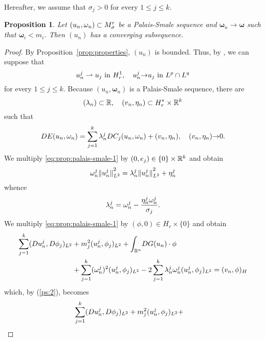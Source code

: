 \documentclass[a4paper,12pt,oneside]{amsart}
\newtheorem{prop}{Proposition}
\theoremstyle{definition}
\theoremstyle{remark}
\theoremstyle{theorem}
\begin{document}
\noindent 
Hereafter, we assume that $ {\sigma}_j > 0 $ for every $ 1\leq j\leq k $.
\begin{prop}
\label{prop:palais-smale}
Let $ (u_n,{\mathbf{\omega}}_n)\subset M_{\sigma}\sp r  $ be a Palais-Smale 
sequence and $ {\mathbf{\omega}}_n {\rightarrow}{\mathbf{\omega}} $ such that $ {\mathbf{\omega}}_i < m_i $.
Then $ (u_n) $ has a converging subsequence.
\end{prop}
\begin{proof}
By Proposition~\ref{prop:properties}, $ (u_n) $
is bounded. Thus, by \cite[Theorem~A.I']{BL83-I}, we can suppose that 
\begin{equation}
\label{eq:prop:palais-smale-9}
u_n \sp j\rightharpoonup u_j\text{ in } H\sp 1 _r,\quad
u_n \sp j{\rightarrow} u_j\text{ in } L\sp p \cap L\sp q 
\end{equation}
for every $ 1\leq j\leq k $.
Because $ (u_n,{\mathbf{\omega}}_n) $ is a Palais-Smale sequence, there are 
\[
(\lambda_n)\subset{\mathbb{R}},\quad
(v_n,\eta_n)\subset H_r \sp *\times{\mathbb{R}}\sp k
\]
such that
\begin{equation}
\label{eq:prop:palais-smale-1}
{D} E (u_n,\omega_n) = \sum_{j = 1}\sp k \lambda_n \sp{j}
{D} C_j (u_n,\omega_n) + (v_n,\eta_n),\quad (v_n,\eta_n){\rightarrow} 0.
\end{equation}
We multiply \eqref{eq:prop:palais-smale-1} by $ (0,e_j)\in \{0\}\times{\mathbb{R}}\sp k $
and obtain
\[
\omega_n\sp{j}{\|{u_n\sp{j}}\|}_{L^2} ^2 = 
\lambda_n \sp{j}{\|{u_n\sp{j}}\|}_{L^2} ^2 + \eta_n \sp{j}
\]
whence
\begin{equation}
\label{ps:2}
\lambda_n \sp{j}  = \omega_n\sp{j} - \frac{\eta_n \sp{j}\omega_n \sp{j}}{{\sigma}_j}.
\end{equation}
We multiply \eqref{eq:prop:palais-smale-1} by 
$ (\phi,0)\in H_r \times\{0\} $ and obtain
\[
\begin{split}
\sum_{j = 1}\sp k ({D} u_n\sp j,{D}\phi_j)_{L\sp 2} &+ 
m_j \sp 2 (u_n\sp j,\phi_j)_{L\sp 2} +
{\int_{{\mathbb{R}}\sp{n}}} {D}{G}(u_n)\cdot\phi \\
&+ 
\sum_{{j} = 1}\sp k (\omega_n \sp{j})^2 (u_n \sp{j} ,\phi_{j})_{L^2}
- 2\sum_{{j} = 1}\sp k\lambda_n \sp{j}  \omega_n \sp{j}
(u_n \sp{j} ,\phi_{j})_{L^2} = (v_n,\phi)_H
\end{split}
\]
which, by (\ref{ps:2}), becomes
\begin{equation}
\label{eq:prop:palais-smale-3}
\begin{split}
\sum_{j = 1}\sp k ({D} u_n\sp j,{D}\phi_j)_{L\sp 2} &+ 
m_j \sp 2 (u_n\sp j,\phi_j)_{L\sp 2} +

\end{split}
\end{equation}
\end{proof}
\end{document}
